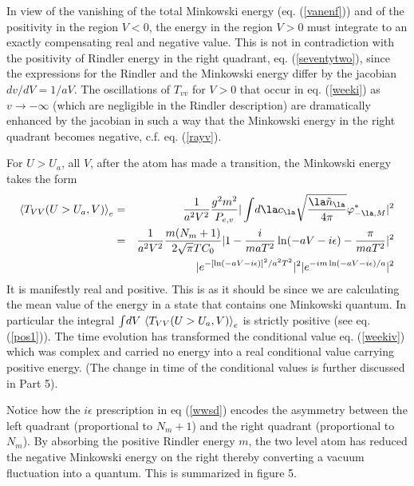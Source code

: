 In view
of the vanishing of the total Minkowski energy (eq. (\ref{vanenf})) and of
the positivity  in the region $V<0$, the
energy in the region $V>0$ must integrate to an exactly compensating real
and negative value. This is not
in contradiction with the positivity of Rindler energy in the right quadrant,
eq. (\ref{seventytwo}),
since the expressions for the Rindler and the Minkowski energy differ by the
jacobian ${ dv / dV} = {1 / aV}$. The oscillations of $T_{vv}$ for
$V>0$ that occur in eq. (\ref{weeki}) as $v \rightarrow - \infty$ (which are
negligible in
the Rindler description) are dramatically enhanced by the jacobian in such a
way that the Minkowski energy in the right quadrant becomes negative, c.f.
eq. (\ref{rayv}).






For $U>U_a$, all $V$,
after the atom has made a transition, the Minkowski energy takes the
form \begin{eqnarray}
\bk{T_{VV}(U>U_a,V)}_{ e} &=&
{1 \over a^2 V^2}{ g^2 m^2 \over
P_{e,v}} \vert \int\! d\la c_\la
\sqrt{ {
\la \tilde n_\la \over 4 \pi}} \varphi_{-\la, M}^*
\vert^2\nonumber\\
&=&{1 \over a^2 V^2} {m (N_m + 1)\over  2 \sqrt{\pi} T C_0} \vert 1 -
{i \over m a
T^2} \ln (-aV-i\e) -  {\pi\over m a T^2}  \vert^2
\nonumber\\
&&\quad\quad
  \vert e^{-{\left[ \ln (-aV-i\epsilon) \right]^2 / a^2 T^2}} \vert^2 \vert
e^{-i{m }\ln (-aV-i\epsilon)/ a } \vert^2  \label{wwsd}\end{eqnarray}
It is manifestly real and positive. This is as it should be since we are
calculating the mean value of the energy in a state that contains one
Minkowski quantum.
In particular the integral $\int\! dV \ \mbox{$ \langle T_{VV}(U>U_a,V) \rangle $}_{ e}$ is
strictly positive (see eq. (\ref{pos1})). The time evolution has transformed
the conditional value eq. (\ref{weekiv}) which was complex and carried no
energy into a real conditional value carrying positive energy. (The change in
time of the conditional values is further discussed in Part 5).

Notice how the $i\epsilon$ prescription in eq (\ref{wwsd}) encodes the
asymmetry between the left quadrant (proportional to $N_m+1$) and the right
quadrant (proportional to $N_m$).
By absorbing the positive Rindler energy $m$, the two level atom has reduced
the negative Minkowski energy on the right thereby converting a vacuum
fluctuation into a quantum. This is summarized in figure 5.

